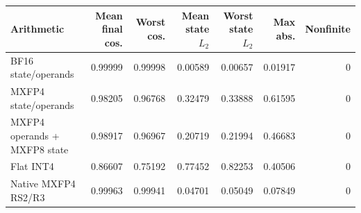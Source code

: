 \begin{tabular}{lrrrrr@{\hspace{1em}}r}
\toprule
Arithmetic & Mean final cos. & Worst cos. & Mean state $L_2$ & Worst state $L_2$ & Max abs. & Nonfinite \\
\midrule
BF16 state/operands & 0.99999 & 0.99998 & 0.00589 & 0.00657 & 0.01917 & 0 \\
MXFP4 state/operands & 0.98205 & 0.96768 & 0.32479 & 0.33888 & 0.61595 & 0 \\
MXFP4 operands + MXFP8 state & 0.98917 & 0.96967 & 0.20719 & 0.21994 & 0.46683 & 0 \\
Flat INT4 & 0.86607 & 0.75192 & 0.77452 & 0.82253 & 0.40506 & 0 \\
Native MXFP4 RS2/R3 & 0.99963 & 0.99941 & 0.04701 & 0.05049 & 0.07849 & 0 \\
\bottomrule
\end{tabular}
